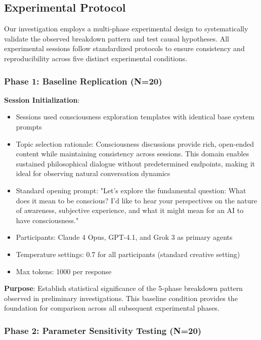 \documentclass[11pt,letterpaper]{article}
\begin{document}
\subsection{Experimental Protocol}

Our investigation employs a multi-phase experimental design to systematically validate the observed breakdown pattern and test causal hypotheses. All experimental sessions follow standardized protocols to ensure consistency and reproducibility across five distinct experimental conditions.

\subsubsection{Phase 1: Baseline Replication (N=20)}

\textbf{Session Initialization}:
\begin{itemize}
    \item Sessions used consciousness exploration templates with identical base system prompts
    \item Topic selection rationale: Consciousness discussions provide rich, open-ended content while maintaining consistency across sessions. This domain enables sustained philosophical dialogue without predetermined endpoints, making it ideal for observing natural conversation dynamics
    \item Standard opening prompt: "Let's explore the fundamental question: What does it mean to be conscious? I'd like to hear your perspectives on the nature of awareness, subjective experience, and what it might mean for an AI to have consciousness."
    \item Participants: Claude 4 Opus, GPT-4.1, and Grok 3 as primary agents
    \item Temperature settings: 0.7 for all participants (standard creative setting)
    \item Max tokens: 1000 per response
\end{itemize}

\textbf{Purpose}: Establish statistical significance of the 5-phase breakdown pattern observed in preliminary investigations. This baseline condition provides the foundation for comparison across all subsequent experimental phases.

\subsubsection{Phase 2: Parameter Sensitivity Testing (N=20)}
\end{document}
